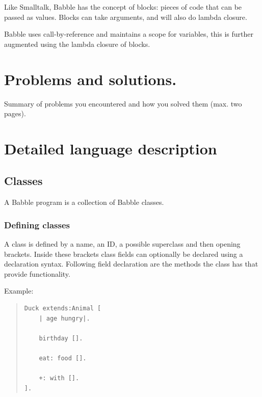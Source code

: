 \documentclass[a4paper]{article}
\begin{document}
Like Smalltalk, Babble has the concept of blocks: pieces of code that can be passed as values.
Blocks can take arguments, and will also do lambda closure.

Babble uses call-by-reference and maintains a scope for variables, this is further augmented using the lambda closure of blocks.

\section{Problems and solutions.}
Summary of problems you encountered and how you solved them (max. two
pages).

\section{Detailed language description}

\subsection{Classes}
A Babble program is a collection of Babble classes.

\subsubsection{Defining classes}
A class is defined by a name, an ID, a possible superclass and then opening brackets. Inside these brackets class fields can optionally be declared using a declaration syntax. Following field declaration are the methods the class has that provide functionality.

Example:
\begin{quote}
\begin{lstlisting}
Duck extends:Animal [
	| age hungry|.
	
	birthday [].
	
	eat: food [].
	
	+: with [].
].
\end{lstlisting}
\end{quote}
\end{document}
